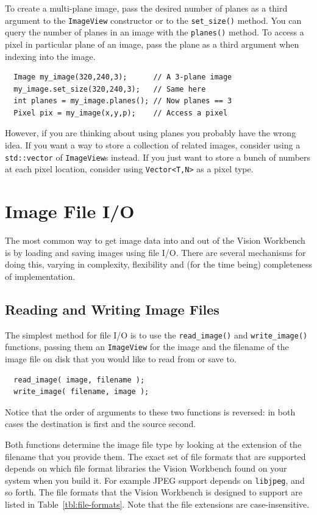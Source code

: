 To create a multi-plane image, pass the desired number of planes as a 
third argument to the \verb#ImageView# constructor or to the 
\verb#set_size()# method.  You can query the number of planes in an 
image with the \verb#planes()# method.  To access a pixel in particular 
plane of an image, pass the plane as a third argument when indexing 
into the image.
\begin{verbatim}
  Image my_image(320,240,3);      // A 3-plane image
  my_image.set_size(320,240,3);   // Same here
  int planes = my_image.planes(); // Now planes == 3
  Pixel pix = my_image(x,y,p);    // Access a pixel
\end{verbatim}
However, if you are thinking about using planes you probably have the 
wrong idea.  If you want a way to store a collection of related images, 
consider using a \verb#std::vector# of \verb#ImageView#s instead.  If 
you just want to store a bunch of numbers at each pixel location, 
consider using \verb#Vector<T,N># as a pixel type.

\section{Image File I/O}

The most common way to get image data into and out of the Vision Workbench 
is by loading and saving images using file I/O.  There are several mechanisms 
for doing this, varying in complexity, flexibility and (for the time being) 
completeness of implementation.

\subsection{Reading and Writing Image Files}

The simplest method for file I/O is to use the \verb#read_image()# and 
\verb #write_image()# functions, passing them an \verb#ImageView# for 
the image and the filename of the image file on disk that you would like 
to read from or save to.
\begin{verbatim}
  read_image( image, filename );
  write_image( filename, image );
\end{verbatim}
Notice that the order of arguments to these two functions is reversed: 
in both cases the destination is first and the source second.

Both functions determine the image file type by looking at the 
extension of the filename that you provide them.  The exact set of 
file formats that are supported depends on which file format libraries 
the Vision Workbench found on your system when you build it.  For 
example JPEG support depends on \verb#libjpeg#, and so forth.  The 
file formats that the Vision Workbench is designed to support are 
listed in Table~\ref{tbl:file-formats}.  Note that the file extensions 
are case-insensitive.

